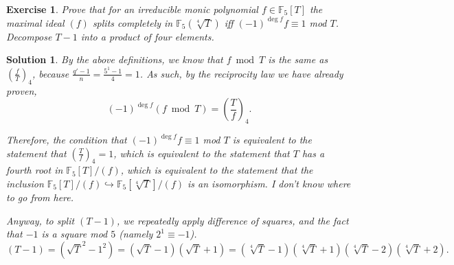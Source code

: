 \documentclass{article}
\newtheorem{ex}{Exercise}
\theoremstyle{nonumberplain}
\newtheorem{sol}{Solution}
\newcommand{\FF}{\mathbb{F}}
\newcommand{\legendre}[2]{\genfrac{(}{)}{}{}{#1}{#2}}
\newcommand{\nlegendre}[3]{\legendre{#1}{#2}_{\!\!#3}}
\begin{document}
\begin{ex}
Prove that for an irreducible monic polynomial $f \in \FF_5[T]$ the maximal ideal $(f)$ splits completely in $\FF_5(\sqrt[4]T)$ iff $(-1)^{\deg f} f \equiv 1$ mod $T$. Decompose $T-1$ into a product of four elements.
\end{ex}

\begin{sol}
By the above definitions, we know that $f \bmod T$ is the same as $\nlegendre fT4$, because $\frac{q'-1}n = \frac{5^1 - 1}4 = 1$. As such, by the reciprocity law we have already proven,
\begin{equation}
(-1)^{\deg f} (f \bmod T) = \nlegendre Tf4.
\end{equation}

Therefore, the condition that $(-1)^{\deg f} f \equiv 1$ mod $T$ is equivalent to the statement that $\nlegendre Tf4 = 1$, which is equivalent to the statement that $T$ has a fourth root in $\FF_5[T]/(f)$, which is equivalent to the statement that the inclusion $\FF_5[T]/(f) \hookrightarrow \FF_5[\sqrt[4]T]/(f)$ is an isomorphism. I don't know where to go from here.

Anyway, to split $(T-1)$, we repeatedly apply difference of squares, and the fact that $-1$ is a square mod $5$ (namely $2^1 \equiv -1$).
\begin{equation}
(T-1) = (\sqrt{T}^2 - 1^2) = (\sqrt T - 1)(\sqrt T + 1) = (\sqrt[4]T - 1)(\sqrt[4]T + 1)(\sqrt[4]T - 2)(\sqrt[4]T + 2).
\end{equation}
\end{sol}
\end{document}
